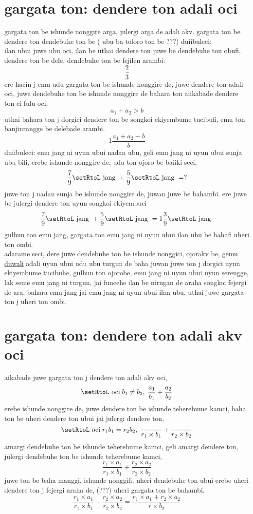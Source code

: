 \documentclass{report}
\begin{document}
\section{gargata ton: dendere ton adali oci}
gargata ton be ishunde nonggire arga, julergi arga de adali akv. gargata ton be 
dendere ton dendebuhe ton be ( ubu ba toloro ton be ???)
duiibuleci:\\
ilan ubui juwe ubu oci, ilan be uthai dendere ton juwe be dendebuhe ton obufi, dendere ton be dele, dendebuhe ton be fejilen arambi:
\[
    \frac{2}{3}
\]
ere hacin j emu udu gargata ton be ishunde nonggire de, juwe dendere ton adali oci, juwe dendebuhe ton be ishunde nonggire de bahara ton aiikabade dendere ton ci fulu oci, 
\[
    a_1 + a_2 > b
\]
uthai bahara ton j dorgici dendere ton be songkoi ekiyembume tucibufi, emu ton banjinrangge be delebade arambi.\\
\[
    1\frac{a_1 + a_2 - b}{b}
\]
duiibuleci:
emu jang ni uyun ubui nadan ubu, geli emu jang ni uyun ubui sunja ubu bifi, erebe ishunde nonggire de, udu ton ojoro be baiiki seci, 
\[
    \frac{7}{9} \text{\setRtoL jang }+ \frac{5}{9}\text{\setRtoL jang } = ?
\]
juwe ton j nadan sunja be ishunde nonggire de, juwan juwe be bahambi. ere juwe be julergi dendere ton uyun songkoi ekiyembuci
\[
    \frac{7}{9} \text{\setRtoL jang }+ \frac{5}{9}\text{\setRtoL jang } = 1\frac{3}{9} \text{\setRtoL jang }
\]
\underline{\setRtoL gulhun ton} emu jang, gargata ton emu jang ni uyun ubui ilan ubu be bahafi uheri ton ombi.\\
adarame seci, dere juwe dendebuhe ton be ishunde nonggici, ojorakv be, gemu \underline{\setRtoL duwali} adali uyun ubui udu ubu turgun de baha juwan juwe ton j dorgici uyun ekiyembume tucibuhe, gulhun ton ojorobe, emu jang ni uyun ubui uyun serengge, lak seme emu jang ni turgun, jai funcehe ilan be nirugan de araha songkoi fejergi de ara, bahara emu jang jai emu jang ni uyun ubui ilan ubu. uthai juwe gargata ton j uheri ton ombi.\\

\section{gargata ton: dendere ton adali akv oci}
aikabade juwe gargata ton j dendere ton adali akv oci, 
\[ \text{\setRtoL oci}\;b_1\neq b_2,\; \frac{a_1}{b_1} + \frac{a_2}{b_2}\]
erebe ishunde nonggire de, juwe dendere ton be ishunde teherebume kamci, baha ton be uheri dendere ton ubui jai julergi dendere ton, 
\[  \text{\setRtoL oci}\; r_1b_1 = r_2b_2,\; \frac{}{r_1\times b_1} + \frac{}{r_2\times b_2} \]
amargi dendebuhe ton be ishunde teherebume kamci, geli amargi dendere ton, julergi dendebuhe ton be ishunde teherebume kamci, 
\[ \frac{r_1\times a_1}{r_1\times b_1} + \frac{r_2\times a_2}{r_2\times b_2} \]
juwe ton be baha manggi, ishunde nonggifi, uheri dendebuhe ton ubui erebe uheri dendere ton j fejergi araha de, (???) uheri gargata ton be bahambi.
\[ \frac{r_1\times a_1}{r_1\times b_1} + \frac{r_2\times a_2}{r_2\times b_2} = \frac{r_1\times a_1+r_2\times a_2}{r\times b_2}\]
\end{document}
